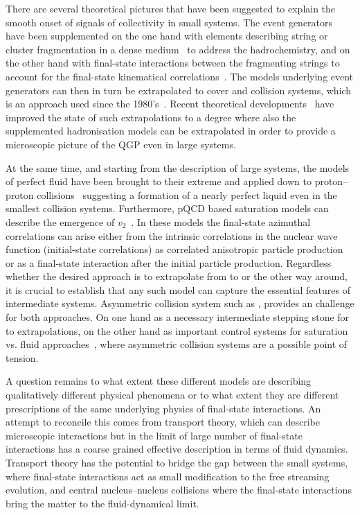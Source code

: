 \documentclass[../report.tex]{subfiles}
\begin{document}
There are several theoretical pictures that have been suggested to explain the smooth onset of signals of collectivity in small systems. The \pp event generators have been supplemented on the one hand with elements describing string or cluster fragmentation in a dense medium~\cite{Bierlich:2014xba,Gieseke:2017clv} to address the hadrochemistry, and on the other hand with final-state interactions between the fragmenting strings to account for the final-state kinematical correlations~\cite{Bierlich:2017vhg}. The models underlying \pp event generators can then in turn be extrapolated to cover \pPb and \PbPb collision systems, which is an approach used since the 1980's~\cite{Andersson:1986gw,Wang:1991hta}. Recent theoretical developments~\cite{Bierlich:2018xfw,Bellm:2018sjt} have improved the state of such extrapolations to a degree where also the supplemented hadronisation models can be extrapolated in order to provide a microscopic picture of the QGP even in large systems.

At the same time, and starting from the description of large systems, the models of perfect fluid have been brought to their extreme and applied down to proton--proton collisions~\cite{Werner:2007bf,Weller:2017tsr,Aidala:2018mcw} suggesting a formation of a nearly perfect liquid even in the smallest collision systems. Furthermore, pQCD based saturation models can describe the emergence of $v_2$~\cite{Schenke:2016lrs}. In these models the final-state azimuthal correlations can arise either from the intrinsic correlations in the nuclear wave function (initial-state correlations) as correlated anisotropic particle production or as a final-state interaction after the initial particle production.
Regardless whether the desired approach is to extrapolate from \pp to \PbPb or the other way around, it is crucial to establish that any such model can capture the essential features of intermediate systems. Asymmetric collision system such as \pPb, provides an challenge for both approaches. On one hand as a necessary intermediate stepping stone for \pp to \AOnA extrapolations, on the other hand as important control systems for saturation vs. fluid approaches~\cite{Mace:2018vqw,Nagle:2018ybc}, where asymmetric collision systems are a possible point of tension.

A question remains to what extent these different models are describing qualitatively different physical phenomena or to what extent they are different prescriptions of the same underlying physics of final-state interactions. An attempt to reconcile this comes from transport theory, which can describe microscopic interactions but in the limit of large number of final-state interactions has a coarse grained effective description in terms of fluid dynamics. Transport theory has the potential to bridge the gap between the small systems, where final-state interactions act as small modification to the free streaming evolution, and central nucleus--nucleus collisions where the final-state interactions bring the matter to the fluid-dynamical limit.
\end{document}
